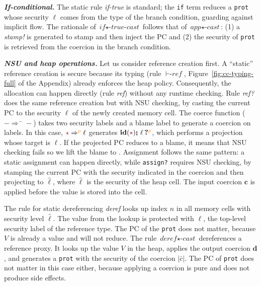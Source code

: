 \textbf{\textit{If-conditional. }} The static rule \textit{if-true} is standard;
the \texttt{if} term reduces a \texttt{prot} whose security $\ell$
comes from the type of the branch condition, guarding against implicit
flow. The rationale of $\textit{if}{\star}\textit{-true-cast}$ follows that
of $\textit{app}{\star}\textit{-cast}$: (1) a \textit{stamp!} is generated to
stamp and then inject the PC and (2) the security of \texttt{prot} is retrieved
from the coercion in the branch condition.

\textbf{\textit{NSU and heap operations. }}
Let us consider reference creation first.
A ``static'' reference creation is secure because its typing (rule
${\vdash}\textit{-ref}$, Figure~\ref{fig:cc-typing-full} of the Appendix)
already enforces the heap policy. Consequently, the allocation can happen directly
(rule \textit{ref}) without any runtime checking. Rule \textit{ref?}
does the same reference creation but with NSU checking, by casting the
current PC to the security $\ell$ of the newly created memory
cell.
The coerce function (${-}\Rightarrow^{-}{-}$) takes two
security labels and a blame label to generate a coercion on labels.
In this case, $\unk \Rightarrow^{\bl{p}} \ell$ generates
$\id{\unk}\seq\proj{\ell}{p}$, which performs a projection whose
target is $\ell$. If the projected PC reduces to a blame, it means
that NSU checking fails so we lift the blame to \CC. Assignment
follows the same pattern: a static assignment can happen directly,
while \texttt{assign?} requires NSU checking, by stamping the current
PC with the security indicated in the coercion and then projecting to
$\hat{\ell}$, where $\hat{\ell}$ is the security of the heap cell.
The input coercion $\bm{c}$ is applied before the value is stored into
the cell.

The rule for static dereferencing \textit{deref} looks up index $n$ in
all memory cells with security level $\hat{\ell}$. The value from the
lookup is protected with $\ell$, the top-level security label of the
reference type. The PC of the \texttt{prot} does not matter, because
$V$ is already a value and will not reduce.
The rule $\textit{deref}{\star}\textit{-cast}$ dereferences a reference proxy.
It looks up the value $V$ in the heap, applies the output coercion $\bm{d}$,
and generates a \texttt{prot} with the security of the coercion $|\bar{c}|$.
The PC of \texttt{prot} does not matter in this case either, because
applying a coercion is pure and does not produce side effects.

